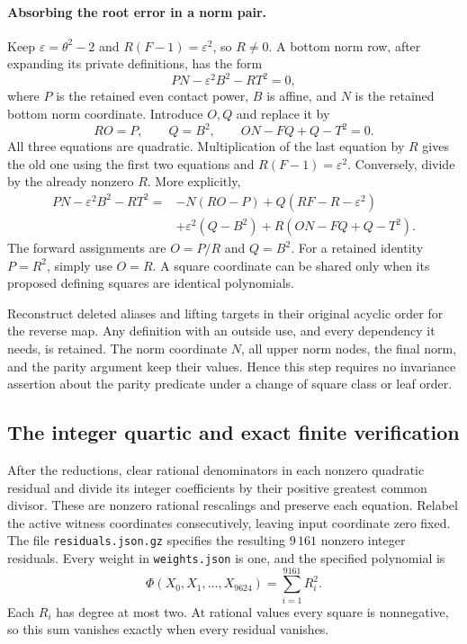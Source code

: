 \documentclass[11pt]{article}
\theoremstyle{definition}
\theoremstyle{remark}
\begin{document}
\paragraph{Absorbing the root error in a norm pair.}
Keep $\varepsilon=\theta^2-2$ and $R(F-1)=\varepsilon^2$, so $R\ne0$.
A bottom norm row, after expanding its private definitions, has the form
\[
 PN-\varepsilon^2B^2-RT^2=0,
\]
where $P$ is the retained even contact power, $B$ is affine, and $N$
is the retained bottom norm coordinate. Introduce $O,Q$ and replace it by
\[
 RO=P,\qquad Q=B^2,\qquad ON-FQ+Q-T^2=0.
\]
All three equations are quadratic. Multiplication of the last equation
by $R$ gives the old one using the first two equations and
$R(F-1)=\varepsilon^2$. Conversely, divide by the already nonzero $R$.
More explicitly,
\begin{align*}
 PN-\varepsilon^2B^2-RT^2
 ={}&-N(RO-P)+Q(RF-R-\varepsilon^2)\\
    &+\varepsilon^2(Q-B^2)+R(ON-FQ+Q-T^2).
\end{align*}
The forward assignments are $O=P/R$ and $Q=B^2$. For a retained
identity $P=R^2$, simply use $O=R$. A square coordinate can be shared
only when its proposed defining squares are identical polynomials.

Reconstruct deleted aliases and lifting targets in their original
acyclic order for the reverse map. Any definition with an outside use,
and every dependency it needs, is retained. The norm coordinate $N$,
all upper norm nodes, the final norm, and the parity argument keep their
values. Hence this step requires no invariance assertion about the
parity predicate under a change of square class or leaf order.

\subsection{The integer quartic and exact finite verification}

After the reductions, clear rational denominators in each nonzero quadratic
residual and divide its integer coefficients by their positive greatest
common divisor. These are nonzero rational rescalings and preserve each
equation. Relabel the active witness coordinates consecutively, leaving
input coordinate zero fixed. The file \nolinkurl{residuals.json.gz}
specifies the resulting $9\,161$ nonzero integer residuals. Every weight
in \nolinkurl{weights.json} is one, and the specified polynomial is
\[
 \Phi(X_0,X_1,\ldots,X_{9624})=\sum_{i=1}^{9161}R_i^2.
\]
Each $R_i$ has degree at most two. At rational values every square is
nonnegative, so this sum vanishes exactly when every residual vanishes.
\end{document}

